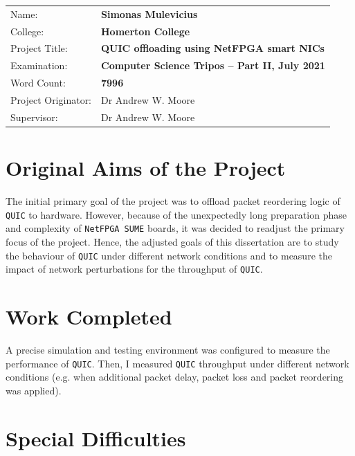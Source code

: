\documentclass[12pt,a4paper,twoside,openright]{report}
\begin{document}
{\large
\begin{tabular}{ll}
Name:               & \bf Simonas Mulevicius                       \\
College:            & \bf Homerton College                     \\
Project Title:      & \bf QUIC offloading using NetFPGA smart NICs \\
Examination:        & \bf Computer Science Tripos -- Part II, July 2021  \\
Word Count:         & \bf 7996\footnotemark[1] \\
Project Originator: & Dr Andrew W. Moore                \\
Supervisor:         & Dr Andrew W. Moore                \\ 
\end{tabular}
}



\section*{Original Aims of the Project}

The initial primary goal of the project was to offload packet reordering logic of \texttt{QUIC} to hardware.
However, because of the unexpectedly long preparation phase and complexity of \texttt{NetFPGA SUME} boards, it was decided to readjust the primary focus of the project.
Hence, the adjusted goals of this dissertation are to study the behaviour of \texttt{QUIC} under different network conditions and to measure the impact of network perturbations for the throughput of \texttt{QUIC}.

\section*{Work Completed}

A precise simulation and testing environment was configured to measure the performance of \texttt{QUIC}.
Then, I measured \texttt{QUIC} throughput under different network conditions (e.g. when additional packet delay, packet loss and packet reordering was applied).

\section*{Special Difficulties}
\end{document}
